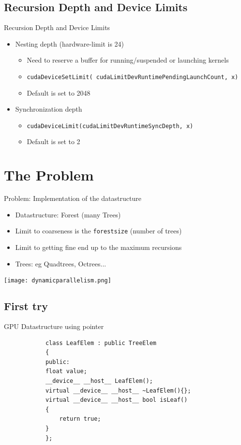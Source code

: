 \documentclass[fleqn,11pt,aspectratio=43]{beamer}
\begin{document}
\subsection{Recursion Depth and Device Limits}
\begin{frame}[fragile]{Recursion Depth and Device Limits}
	\begin{itemize}
		\item Nesting depth (hardware-limit is 24)
			\begin{itemize}
				\item Need to reserve a buffer for running/suspended or launching kernels
				\item \texttt{cudaDeviceSetLimit( cudaLimitDevRuntimePendingLaunchCount, x)}
				\item Default is set to 2048
			\end{itemize}
		\item Synchronization depth
			\begin{itemize}
				\item \texttt{cudaDeviceLimit(cudaLimitDevRuntimeSyncDepth, x)}
				\item Default is set to 2
			\end{itemize}
	\end{itemize}
\end{frame}


\section{The Problem}
	\begin{frame}{Problem: Implementation of the datastructure}
		\begin{itemize}
			\item Datastructure: Forest (many Trees)
			\item Limit to coarseness is the \texttt{forestsize} (number of trees)
			\item Limit to getting fine end up to the maximum recursions
			\item Trees: eg Quadtrees, Octrees...
		\end{itemize}
		\centering	
		\texttt{[image: dynamicparallelism.png]}	
	\end{frame}
\subsection{First try}

\begin{frame}[fragile]{GPU Datastructure using pointer}
	\begin{verbatim}
			class LeafElem : public TreeElem
			{
			public:
  			float value;
  			__device__ __host__ LeafElem();
  			virtual __device__ __host__ ~LeafElem(){};
  			virtual __device__ __host__ bool isLeaf()
  			{
    			return true;
  			}
			};
	\end{verbatim}
\end{frame}
\end{document}
